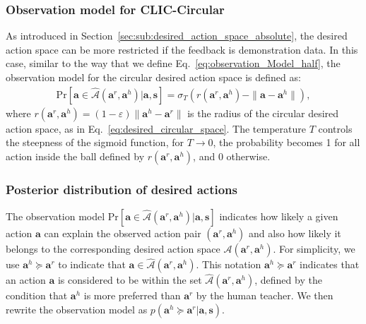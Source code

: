 \subsubsection{Observation model for CLIC-Circular}
As introduced in Section~\ref{sec:sub:desired_action_space_absolute},
the desired action space can be more restricted if the feedback is demonstration data. In this case, similar to the way that we define Eq.~\eqref{eq:observation_Model_half}, the observation model for the circular desired action space is defined as: 
\begin{align*}
    \text{Pr} [\bm a \in \hat{\mathcal{A}} {(\bm a^r, \bm a^h)} | \bm a , \bm s] =   \sigma_T( r(\bm a^r, \bm a^h) - \| \bm a- \bm a^h\|), 
\end{align*}
where $r(\bm a^r, \bm a^h)  =  (1-\varepsilon)\| \bm a^h - \bm a^r\|$ is the radius of the circular desired action space, as in Eq.~\eqref{eq:desired_circular_space}.
The temperature $T$ controls the steepness of the sigmoid function, for $T \rightarrow 0$, the probability becomes 1 for all action inside the ball defined by $r(\bm a^r, \bm a^h)$, and 0 otherwise. 


\subsubsection{Posterior distribution of desired actions}

The observation model $\text{Pr} [\bm a \in \hat {\mathcal{A}} {(\bm a^r, \bm a^h)} | \bm a , \bm s]$ indicates how likely a given action $\bm a$ can explain the observed action pair $(\bm a^r, \bm a^h)$ and also how likely it belongs to the corresponding desired action space ${\mathcal{A}} {(\bm a^r, \bm a^h)}$. 
For simplicity, we use $\bm a^h \succeq \bm a^r$ to indicate that $\bm a \in \hat {\mathcal{A}} {(\bm a^r, \bm a^h)}$. This notation $\bm a^h \succeq \bm a^r$ indicates that an action $\bm a$ is considered to be within the set $\hat {\mathcal{A}} {(\bm a^r, \bm a^h)}$, defined by the condition that $\bm a^h$ is more preferred than $\bm a^r$ by the human teacher. 
We then rewrite the observation model as
$p (\bm a^h \succeq \bm a^r | \bm a ,\bm s)$.



